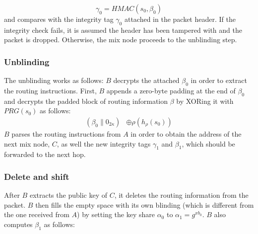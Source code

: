     $$\gamma_0=HMAC(s_0,\beta_0)$$
and compares with the integrity tag $\gamma_0$ attached in the packet header. If the integrity check fails, it is assumed the header has been tampered with and the packet is dropped. Otherwise, the mix node proceeds to the unblinding step.

\subsubsection{Unblinding}
The unblinding works as follows: $B$ decrypts the attached $\beta_0$ in order to extract the routing instructions. First, $B$ appends a zero-byte padding at the end of $\beta_0$ and decrypts the padded block of routing information $\beta$ by XORing it with $PRG(s_{0})$ as follows:
\begin{align}
    (\beta_0\|0_{2\kappa})&\oplus \rho(h_{\rho}(s_{0}))
\end{align}
$B$ parses the routing instructions from $A$ in order to obtain the address of the next mix node, $C$, as well the new integrity tags $\gamma_1$ and $\beta_1$, which should be forwarded to the next hop.

\subsubsection{Delete and shift}
After $B$ extracts the public key of $C$, it deletes the routing information from the packet. $B$ then fills the empty space with its own blinding (which is different from the one received from $A$) by setting the key share $\alpha_0$ to $\alpha_1=g^{xb_0}$. $B$ also computes $\beta_1$ as follows:

